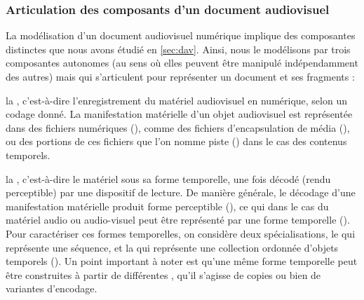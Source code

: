 \subsubsection{Articulation des composants d'un document audiovisuel}
La modélisation d'un document audiovisuel numérique implique des composantes distinctes que nous avons étudié en \ref{sec:dav}. 
Ainsi, nous le modélisons par trois composantes autonomes (au sens où elles peuvent être manipulé indépendamment des autres) mais qui s'articulent pour représenter un document et ses fragments : 
\begin{liste}
	\item la , c'est-à-dire l'enregistrement du matériel audiovisuel en numérique, selon un codage donné.
	La manifestation matérielle d'un objet audiovisuel est représentée dans des fichiers numériques (), comme des fichiers d'encapsulation de média (), ou des portions de ces fichiers que l'on nomme piste () dans le cas des contenus temporels.

	\item la , c'est-à-dire le matériel sous sa forme temporelle, une fois décodé (rendu perceptible) par une dispositif de lecture. 
	De manière générale, le décodage d'une manifestation matérielle produit forme perceptible (), ce qui dans le cas du matériel audio ou audio-visuel peut être représenté par une forme temporelle ().
	Pour caractériser ces formes temporelles, on considère deux spécialisations, le  qui représente une séquence, et la  qui représente une collection ordonnée d'objets temporels ().
	Un point important à noter est qu'une même forme temporelle peut être construites à partir de différentes , qu'il s'agisse de copies ou bien de variantes d'encodage. 
	

\end{liste}
